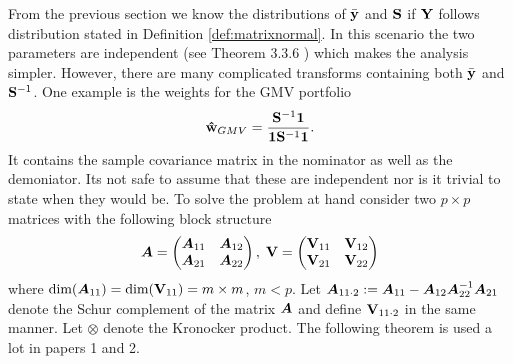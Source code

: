 \documentclass[oneside]{book}\usepackage{knitr}
\begin{document}
From the previous section we know the distributions of $\bar{\mathbf{y}}$ and $\mathbf{S}$ if $\mathbf{Y}$ follows distribution stated in Definition \ref{def:matrixnormal}. 
In this scenario the two parameters are independent (see Theorem 3.3.6 \citet{GuptaNagar2000}) which makes the analysis simpler.
However, there are many complicated transforms containing both $\bar{\mathbf{y}}$ and $\mathbf{S}^{-1}$.
One example is the weights for the GMV portfolio
$$
\mathbf{\hat{w}}_{GMV}=\frac{\mathbf{S}^{-1}\mathbf{1}}{\mathbf{1}\mathbf{S}^{-1}\mathbf{1}}.
$$
It contains the sample covariance matrix in the nominator as well as the demoniator.
Its not safe to assume that these are independent nor is it trivial to state when they would be.
To solve the problem at hand consider two $p\times p$ matrices with the following block structure 
\begin{equation}\label{eqn:blockmat}
\mbox{\boldmath$A$} = \begin{pmatrix}
       \mbox{\boldmath$A$}_{11} & \mbox{\boldmath$A$}_{12} \\
       \mbox{\boldmath$A$}_{21} & \mbox{\boldmath$A$}_{22}
      \end{pmatrix},\;
\mathbf{V} = \begin{pmatrix}
           \mathbf{V}_{11} & \mathbf{V}_{12} \\
           \mathbf{V}_{21} & \mathbf{V}_{22}
          \end{pmatrix}
\end{equation}
where $\text{dim}(\mbox{\boldmath$A$}_{11}) = \text{dim}(\mathbf{V}_{11})= m \times m$, $m<p$. 
Let $\mbox{\boldmath$A$}_{11\cdot 2} := \mbox{\boldmath$A$}_{11} - \mbox{\boldmath$A$}_{12} \mbox{\boldmath$A$}_{22}^{-1} \mbox{\boldmath$A$}_{21}$ denote the Schur complement of the matrix $\mbox{\boldmath$A$}$ and define $\mathbf{V}_{11\cdot 2}$ in the same manner. 
Let $\otimes$ denote the Kronocker product. 
The following theorem is used a lot in papers 1 and 2.
\end{document}
